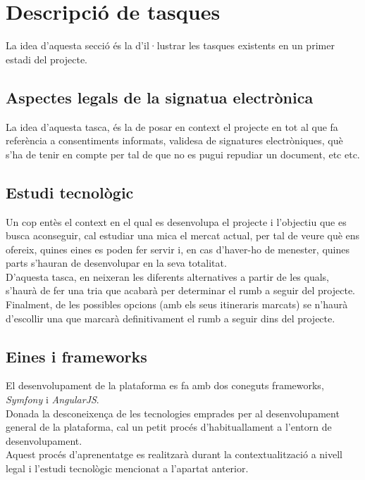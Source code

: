 \section{Descripció de tasques}
La idea d'aquesta secció és la d'il·lustrar les tasques existents en un primer estadi del projecte.

\subsection{Aspectes legals de la signatua electrònica}
La idea d'aquesta tasca, és la de posar en context el projecte en tot al que fa referència a consentiments informats, validesa de signatures electròniques, què s'ha de tenir en compte per tal de que no es pugui repudiar un document, etc etc.

\subsection{Estudi tecnològic}
Un cop entès el context en el qual es desenvolupa el projecte i l'objectiu que es busca aconseguir, cal estudiar una mica el mercat actual, per tal de veure què ens ofereix, quines eines es poden fer servir i, en cas d'haver-ho de menester, quines parts s'hauran de desenvolupar en la seva totalitat.\\
\newline D'aquesta tasca, en neixeran les diferents alternatives a partir de les quals, s'haurà de fer una tria que acabarà per determinar el rumb a seguir del projecte.\\
\newline Finalment,  de les possibles opcions (amb els seus itineraris marcats) se n'haurà d'escollir una que marcarà definitivament el rumb a seguir dins del projecte.

\subsection{Eines i frameworks}
El desenvolupament de la plataforma es fa amb dos coneguts frameworks, \textit{Symfony}\cite{symfony} i \textit{AngularJS}\cite{angular}.\\
Donada la desconeixença de les tecnologies emprades per al desenvolupament general de la plataforma, cal un petit procés d'habituallament a l'entorn de desenvolupament.\\
Aquest procés d'aprenentatge es realitzarà durant la contextualització a nivell legal i l'estudi tecnològic mencionat a l'apartat anterior.

